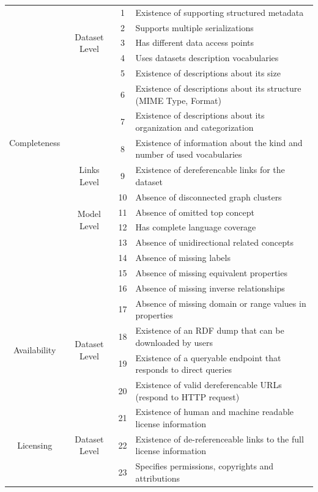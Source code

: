 \documentclass[onecolumn, crcready]{iosart2c}
\begin{document}
\begin{center}
{\begin{longtable}[h]{|c|c|c|l|}
\multirow{15}{*}{Completeness}
 & \multirow{5}{*}{Dataset Level} & 1 & Existence of supporting structured metadata  \cite{Hogan2010}\tabularnewline
\cline{3-4}
 &  & 2 & Supports multiple serializations \cite{Framework2012}\tabularnewline
\cline{3-4}
 &  & 3 & Has different data access points \tabularnewline
\cline{3-4}
 &  & 4 & Uses datasets description vocabularies \tabularnewline
\cline{3-4}
 &  & 5 & Existence of descriptions about its size \tabularnewline
 \cline{3-4}
 &  & 6 & Existence of descriptions about its structure (MIME Type, Format) \tabularnewline
 \cline{3-4}
 &  & 7 & Existence of descriptions about its organization and categorization \tabularnewline
 \cline{3-4}
 &  & 8 & Existence of information about the kind and number of used vocabularies \cite{Framework2012}\tabularnewline
\cline{2-4}
 & \multirow{1}{*}{Links Level} & 9 & Existence of dereferencable links for the dataset \cite{Hogan2010}\cite{Mader2012}\cite{Gueret2012}\tabularnewline
\cline{2-4}
 & \multirow{4}{*}{Model Level} & 10 & Absence of disconnected graph clusters \cite{Mader2012}\tabularnewline
\cline{3-4}
 &  & 11 & Absence of omitted top concept \cite{Hogan2010}\tabularnewline
 \cline{3-4}
 &  & 12 & Has complete language coverage \cite{Mader2012}\tabularnewline
\cline{3-4}
 &  & 13 & Absence of unidirectional related concepts \cite{Hogan2010}\tabularnewline
 \cline{3-4}
 &  & 14 & Absence of missing labels \cite{Mader2012}\tabularnewline
 \cline{3-4}
 &  & 15 & Absence of missing equivalent properties \cite{DBLP:conf/ic3k/KeetSP13}\tabularnewline
 \cline{3-4}
 &  & 16 & Absence of missing inverse relationships \cite{DBLP:conf/ic3k/KeetSP13}\tabularnewline
 \cline{3-4}
 &  & 17 & Absence of missing domain or range values in properties \cite{DBLP:conf/ic3k/KeetSP13}\tabularnewline
\hline
\hline
\multirow{2}{*}{Availability} & \multirow{2}{*}{Dataset Level} & 18 & Existence of an RDF dump that can be downloaded by users \cite{flemming2010}\cite{Hogan2010}\tabularnewline
\cline{3-4}
 &  & 19 & Existence of a queryable endpoint that responds to direct queries \tabularnewline
\cline{3-4}
 &  & 20 & Existence of valid dereferencable URLs (respond to HTTP request) \tabularnewline
\hline
\hline
\multirow{3}{*}{Licensing} & \multirow{3}{*}{Dataset Level} & 21 & Existence of human and machine readable license information \cite{Hogan:2012:ESL:2263498.2264570}\tabularnewline
\cline{3-4}
 &  & 22 & Existence of de-referenceable links to the full license information  \cite{Hogan:2012:ESL:2263498.2264570}\tabularnewline
\cline{3-4}
 &  & 23 & Specifies permissions, copyrights and attributions  \cite{Framework2012}\tabularnewline

\end{longtable}}
\end{center}
\end{document}
